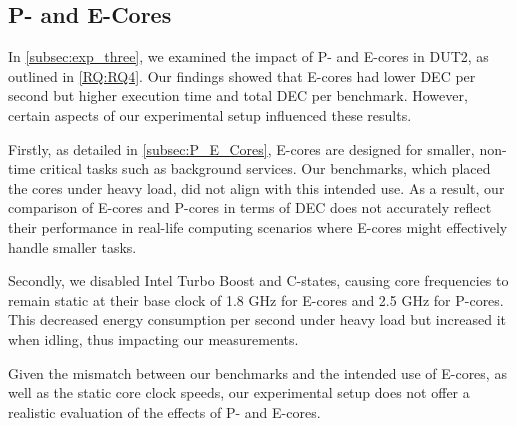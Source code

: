 \subsection{P- and E-Cores}
In \cref{subsec:exp_three}, we examined the impact of P- and E-cores in DUT2, as outlined in \cref{RQ:RQ4}. Our findings showed that E-cores had lower DEC per second but higher execution time and total DEC per benchmark. However, certain aspects of our experimental setup influenced these results.

Firstly, as detailed in \cref{subsec:P_E_Cores}, E-cores are designed for smaller, non-time critical tasks such as background services. Our benchmarks, which placed the cores under heavy load, did not align with this intended use. As a result, our comparison of E-cores and P-cores in terms of DEC does not accurately reflect their performance in real-life computing scenarios where E-cores might effectively handle smaller tasks.

Secondly, we disabled Intel Turbo Boost and C-states, causing core frequencies to remain static at their base clock of 1.8 GHz for E-cores and 2.5 GHz for P-cores. This decreased energy consumption per second under heavy load but increased it when idling, thus impacting our measurements.

Given the mismatch between our benchmarks and the intended use of E-cores, as well as the static core clock speeds, our experimental setup does not offer a realistic evaluation of the effects of P- and E-cores.


